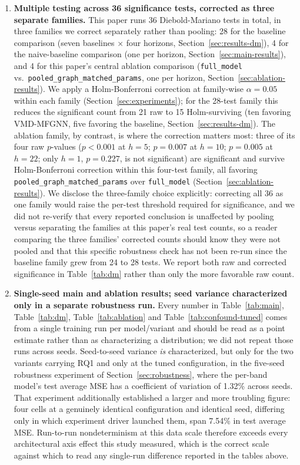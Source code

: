 \documentclass[journal]{IEEEtran}
\begin{document}
\begin{enumerate}
    \item \textbf{Multiple testing across 36 significance tests, corrected as three separate families.} This paper runs 36 Diebold-Mariano tests in total, in three families we correct separately rather than pooling: 28 for the baseline comparison (seven baselines $\times$ four horizons, Section~\ref{sec:results-dm}), 4 for the naive-baseline comparison (one per horizon, Section~\ref{sec:main-results}), and 4 for this paper's central ablation comparison (\texttt{full\_model} vs.\ \texttt{pooled\_graph\_matched\_params}, one per horizon, Section~\ref{sec:ablation-results}). We apply a Holm-Bonferroni correction at family-wise $\alpha=0.05$ within each family (Section~\ref{sec:experiments}); for the 28-test family this reduces the significant count from 21 raw to 15 Holm-surviving (ten favoring VMD-MFGNN, five favoring the baseline, Section~\ref{sec:results-dm}). The ablation family, by contrast, is where the correction matters most: three of its four raw $p$-values ($p<0.001$ at $h=5$; $p=0.007$ at $h=10$; $p=0.005$ at $h=22$; only $h=1$, $p=0.227$, is not significant) are significant and survive Holm-Bonferroni correction within this four-test family, all favoring \texttt{pooled\_graph\_matched\_params} over \texttt{full\_model} (Section~\ref{sec:ablation-results}). We disclose the three-family choice explicitly: correcting all 36 as one family would raise the per-test threshold required for significance, and we did not re-verify that every reported conclusion is unaffected by pooling versus separating the families at this paper's real test counts, so a reader comparing the three families' corrected counts should know they were not pooled and that this specific robustness check has not been re-run since the baseline family grew from 24 to 28 tests. We report both raw and corrected significance in Table~\ref{tab:dm} rather than only the more favorable raw count.
    \item \textbf{Single-seed main and ablation results; seed variance characterized only in a separate robustness run.} Every number in Table~\ref{tab:main}, Table~\ref{tab:dm}, Table~\ref{tab:ablation} and Table~\ref{tab:confound-tuned} comes from a single training run per model/variant and should be read as a point estimate rather than as characterizing a distribution; we did not repeat those runs across seeds. Seed-to-seed variance \emph{is} characterized, but only for the two variants carrying RQ1 and only at the tuned configuration, in the five-seed robustness experiment of Section~\ref{sec:robustness}, where the per-band model's test average MSE has a coefficient of variation of 1.32\% across seeds. That experiment additionally established a larger and more troubling figure: four cells at a genuinely identical configuration and identical seed, differing only in which experiment driver launched them, span 7.54\% in test average MSE. Run-to-run nondeterminism at this data scale therefore exceeds every architectural axis effect this study measured, which is the correct scale against which to read any single-run difference reported in the tables above.

\end{enumerate}
\end{document}
